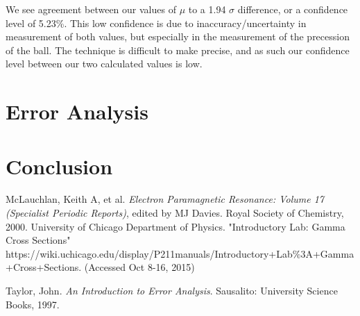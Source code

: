 \documentclass{article}
\begin{document}
	\vspace{.25cm}

	We see agreement between our values of $\mu$ to a 1.94 $\sigma$ difference, or a confidence level of 5.23\%.  This low confidence is due to inaccuracy/uncertainty in measurement of both values, but especially in the measurement of the precession of the ball.  The technique is difficult to make precise, and as such our confidence level between our two calculated values is low.

\section{Error Analysis}

\section{Conclusion}

\begin{thebibliography}{10}
		McLauchlan, Keith A, et al. \emph{Electron Paramagnetic Resonance: Volume 17 (Specialist Periodic Reports)}, edited by MJ Davies. Royal Society of Chemistry, 2000.
		University of Chicago Department of Physics. "Introductory Lab: Gamma Cross Sections"\\
		https://wiki.uchicago.edu/display/P211manuals/Introductory+Lab\%3A+Gamma+Cross+Sections. (Accessed Oct 8-16, 2015)

		Taylor, John. \emph{An Introduction to Error Analysis}. Sausalito: University Science Books, 1997.
		
\end{thebibliography}
\end{document}
